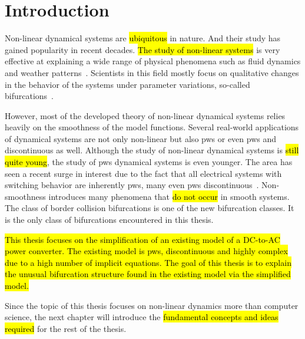 \chapter{Introduction}
\label{chap:intro}

Non-linear dynamical systems are \hl{ubiquitous} in nature.
And their study has gained popularity in recent decades.
\hl{The study of non-linear systems} is very effective at explaining a wide range of physical phenomena such as fluid dynamics and weather patterns~\cite{bernardo2008piecewise}.
Scientists in this field mostly focus on qualitative changes in the behavior of the systems under parameter variations, so-called bifurcations~\cite{simpson2010}.

However, most of the developed theory of non-linear dynamical systems relies heavily on the smoothness of the model functions.
Several real-world applications of dynamical systems are not only non-linear but also \gls{pws} or even \gls{pws} and discontinuous as well.
Although the study of non-linear dynamical systems is \hl{still quite young}, the study of \gls{pws} dynamical systems is even younger.
The area has seen a recent surge in interest due to the fact that all electrical systems with switching behavior are inherently \gls{pws}, many even \gls{pws} discontinuous~\cite{simpson2010}.
Non-smoothness introduces many phenomena that \hl{do not occur} in smooth systems.
The class of border collision bifurcations is one of the new bifurcation classes.
It is the only class of bifurcations encountered in this thesis.

\hl{
	This thesis focuses on the simplification of an existing model of a DC-to-AC power converter.
	The existing model is \gls{pws}, discontinuous and highly complex due to a high number of implicit equations.
	The goal of this thesis is to explain the unusual bifurcation structure found in the existing model via the simplified model.
}


Since the topic of this thesis focuses on non-linear dynamics more than computer science, the next chapter will introduce the \hl{fundamental concepts and ideas required} for the rest of the thesis.
